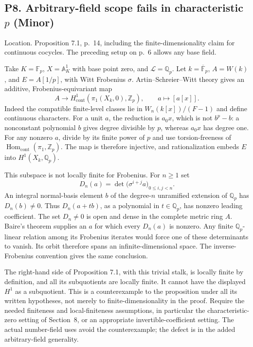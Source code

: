 \documentclass[10pt]{article}
\begin{document}
\subsection*{P8. Arbitrary-field scope fails in characteristic \(p\) (Minor)}
Location. Proposition 7.1, p. 14, including the finite-dimensionality claim for continuous cocycles. The preceding setup on p. 6 allows any base field.\par
Take \(K=\mathbb F_p\), \(X=\mathbb A^1_K\) with base point zero, and \(\mathcal L=\mathbb Q_p\). Let \(k=\overline{\mathbb F}_p\), \(A=W(k)\), and \(E=A[1/p]\), with Witt Frobenius \(\sigma\). Artin–Schreier–Witt theory gives an additive, Frobenius-equivariant map \[A\longrightarrow H^1_{\mathrm{cont}}(\pi_1(X_k,0),\mathbb Z_p),
           \qquad a\longmapsto[a[x]].\] Indeed the compatible finite-level classes lie in \(W_n(k[x])/(F-1)\) and define continuous characters. For a unit \(a\), the reduction is \(a_0x\), which is not \(b^p-b\): a nonconstant polynomial \(b\) gives degree divisible by \(p\), whereas \(a_0x\) has degree one. For any nonzero \(a\), divide by its finite power of \(p\) and use torsion-freeness of \(\operatorname{Hom}_{\mathrm{cont}}(\pi_1,\mathbb Z_p)\). The map is therefore injective, and rationalization embeds \(E\) into \(H^1(X_k,\mathbb Q_p)\).\par
This subspace is not locally finite for Frobenius. For \(n\ge1\) set \[D_n(a)=\det\bigl(\sigma^{i+j}a\bigr)_{0\le i,j<n}.\] An integral normal-basis element \(b\) of the degree-\(n\) unramified extension of \(\mathbb Q_p\) has \(D_n(b)\ne0\). Thus \(D_n(a+tb)\), as a polynomial in \(t\in\mathbb Q_p\), has nonzero leading coefficient. The set \(D_n\ne0\) is open and dense in the complete metric ring \(A\). Baire’s theorem supplies an \(a\) for which every \(D_n(a)\) is nonzero. Any finite \(\mathbb Q_p\)-linear relation among its Frobenius iterates would force one of these determinants to vanish. Its orbit therefore spans an infinite-dimensional space. The inverse-Frobenius convention gives the same conclusion.\par
The right-hand side of Proposition 7.1, with this trivial stalk, is locally finite by definition, and all its subquotients are locally finite. It cannot have the displayed \(H^1\) as a subquotient. This is a counterexample to the proposition under all its written hypotheses, not merely to finite-dimensionality in the proof. Require the needed finiteness and local-finiteness assumptions, in particular the characteristic-zero setting of Section 8, or an appropriate invertible-coefficient setting. The actual number-field uses avoid the counterexample; the defect is in the added arbitrary-field generality.\par
\end{document}
